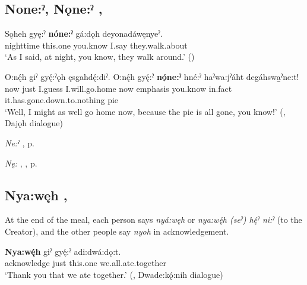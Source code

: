 \subsection*{\textbf{None:ˀ, Nǫne:ˀ} , } \label{p:[none:ˀ]}

\ea
\label{ex:npar129}
\gll Sǫheh gyę:ˀ \textbf{nóne:ˀ} gá:dǫh deyonadáwęnyeˀ. \\
nighttime this.one you.know I.say they.walk.about\\
\glt ‘As I said, at night, you know, they walk around.’ (\cite{mithun_how_1980})
\z

\ea
\label{ex:npar130}
\gll O:nę́h giˀ gyę́:ˀǫh ęsgahdę́:diˀ. O:nę́h gyę́:ˀ \textbf{nǫ́ne:ˀ} hné:ˀ haˀwa:jˀáht degáhswa̱ˀne:t! \\
now just I.guess I.will.go.home now emphasis you.know in.fact it.has.gone.down.to.nothing pie\\
\glt ‘Well, I might as well go home now, because the pie is all gone, you know!’ (\cite[376]{mithun_watewayestanih_1984}, Dajǫh dialogue)
\z

\begin{CayugaRelated}
\item \textit{Ne:ˀ} , p. \pageref{p:[ne:ˀ] `it is’}\\
\item \textit{Nę:} , , p. \pageref{p:[nę:] ‘this, these’}
\end{CayugaRelated}


\subsection*{\textbf{Nya:węh} , } \label{p:[nya:węh]}
 At the end of the meal, each person says \textit{nyá:węh}  or \textit{nya:wę́h (seˀ) hę́ˀ ni:ˀ}  (to the Creator), and the other people say \textit{nyoh} in acknowledgement.

\ea
\label{ex:npar131}
\gll \textbf{Nya:wę́h} giˀ gyę́:ˀ adi:dwá:dǫ:t. \\
acknowledge just this.one we.all.ate.together\\
\glt ‘Thank you that we ate together.’ (\cite[294]{mithun_watewayestanih_1984}, Dwade:kǫ́:nih dialogue)
\z

